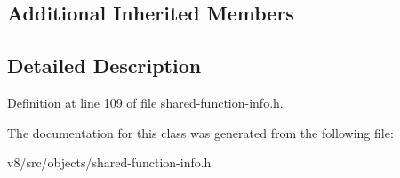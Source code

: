 \subsection*{Additional Inherited Members}


\subsection{Detailed Description}


Definition at line 109 of file shared-\/function-\/info.\+h.



The documentation for this class was generated from the following file\+:\begin{DoxyCompactItemize}
\item 
v8/src/objects/shared-\/function-\/info.\+h\end{DoxyCompactItemize}
